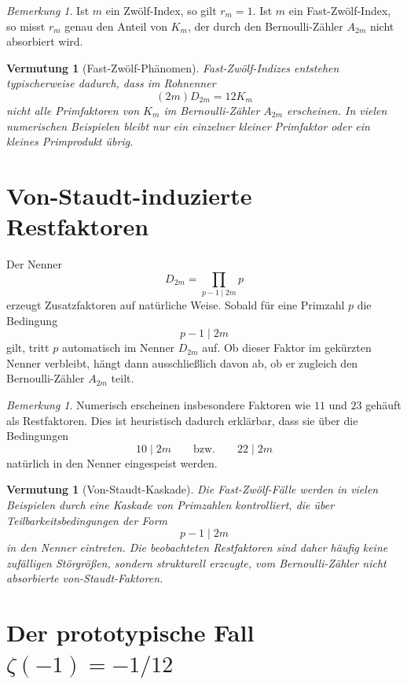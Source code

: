 \documentclass[11pt,a4paper]{article}
\theoremstyle{definition}
\theoremstyle{plain}
\newtheorem{vermutung}[definition]{Vermutung}
\theoremstyle{remark}
\newtheorem{bemerkung}[definition]{Bemerkung}
\begin{document}
	\begin{bemerkung}
		Ist $m$ ein Zwölf-Index, so gilt $r_m=1$. Ist $m$ ein Fast-Zwölf-Index, so misst $r_m$ genau den Anteil von $K_m$, der durch den Bernoulli-Zähler $A_{2m}$ nicht absorbiert wird.
	\end{bemerkung}
	
	\begin{vermutung}[Fast-Zwölf-Phänomen]
		Fast-Zwölf-Indizes entstehen typischerweise dadurch, dass im Rohnenner
		\[
		(2m)D_{2m}=12K_m
		\]
		nicht alle Primfaktoren von $K_m$ im Bernoulli-Zähler $A_{2m}$ erscheinen. In vielen numerischen Beispielen bleibt nur ein einzelner kleiner Primfaktor oder ein kleines Primprodukt übrig.
	\end{vermutung}
	
	\section{Von-Staudt-induzierte Restfaktoren}
	
	Der Nenner
	\[
	D_{2m}=\prod_{p-1\mid 2m} p
	\]
	erzeugt Zusatzfaktoren auf natürliche Weise. Sobald für eine Primzahl $p$ die Bedingung
	\[
	p-1\mid 2m
	\]
	gilt, tritt $p$ automatisch im Nenner $D_{2m}$ auf. Ob dieser Faktor im gekürzten Nenner verbleibt, hängt dann ausschließlich davon ab, ob er zugleich den Bernoulli-Zähler $A_{2m}$ teilt.
	
	\begin{bemerkung}
		Numerisch erscheinen insbesondere Faktoren wie $11$ und $23$ gehäuft als Restfaktoren. Dies ist heuristisch dadurch erklärbar, dass sie über die Bedingungen
		\[
		10\mid 2m
		\qquad\text{bzw.}\qquad
		22\mid 2m
		\]
		natürlich in den Nenner eingespeist werden.
	\end{bemerkung}
	
	\begin{vermutung}[Von-Staudt-Kaskade]
		Die Fast-Zwölf-Fälle werden in vielen Beispielen durch eine Kaskade von Primzahlen kontrolliert, die über Teilbarkeitsbedingungen der Form
		\[
		p-1\mid 2m
		\]
		in den Nenner eintreten. Die beobachteten Restfaktoren sind daher häufig keine zufälligen Störgrößen, sondern strukturell erzeugte, vom Bernoulli-Zähler nicht absorbierte von-Staudt-Faktoren.
	\end{vermutung}
	
	\section{Der prototypische Fall \texorpdfstring{$\zeta(-1)=-1/12$}{zeta(-1)=-1/12}}
	
\end{document}
